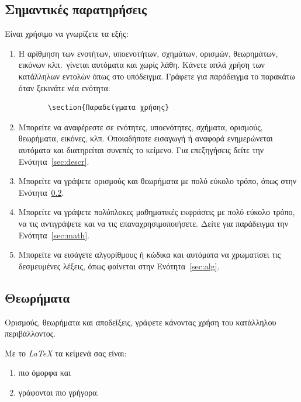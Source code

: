 \documentclass[a4paper,11pt]{article}
\begin{document}
\subsection{Σημαντικές παρατηρήσεις}
Είναι χρήσιμο να γνωρίζετε τα εξής:
\begin{enumerate}
    \item Η αρίθμηση των ενοτήτων, υποενοτήτων, σχημάτων, ορισμών, θεωρημάτων, εικόνων κλπ.\ γίνεται αυτόματα και χωρίς λάθη. Κάνετε απλά χρήση των κατάλληλων εντολών όπως στο υπόδειγμα. Γράφετε για παράδειγμα το παρακάτω όταν ξεκινάτε νέα ενότητα: 
    \begin{verbatim}
       \section{Παραδείγματα χρήσης}
    \end{verbatim}
    \item Μπορείτε να αναφέρεστε σε ενότητες, υποενότητες, σχήματα, ορισμούς, θεωρήματα, εικόνες, κλπ. Οποιαδήποτε εισαγωγή ή αναφορά ενημερώνεται αυτόματα και διατηρείται συνεπές το κείμενο. Για επεξηγήσεις δείτε την Ενότητα~\ref{sec:descr}.
    \item Μπορείτε να γράψετε ορισμούς και θεωρήματα με πολύ εύκολο τρόπο, όπως στην Ενότητα~\ref{sec:theorem}.
    \item Μπορείτε να γράψετε πολύπλοκες μαθηματικές εκφράσεις με πολύ εύκολο τρόπο, να τις αντιγράψετε και να τις επαναχρησιμοποιήσετε. Δείτε για παράδειγμα την Ενότητα~\ref{sec:math}.  
    \item Μπορείτε να εισάγετε αλγορίθμους ή κώδικα και αυτόματα να χρωματίσει τις δεσμευμένες λέξεις, όπως φαίνεται στην Ενότητα~\ref{sec:alg}. 
\end{enumerate}

%
%
\subsection{Θεωρήματα}\label{sec:theorem}
Ορισμούς, θεωρήματα και αποδείξεις, γράφετε κάνοντας χρήση του κατάλληλου περιβάλλοντος.

\begin{theorem}
Με το \emph{\LaTeX} \cite{Lamport86} τα κείμενά σας είναι: 
\begin{enumerate}
\item
πιο όμορφα και 
\item
γράφονται πιο γρήγορα.
\end{enumerate}
\end{theorem}
\end{document}
